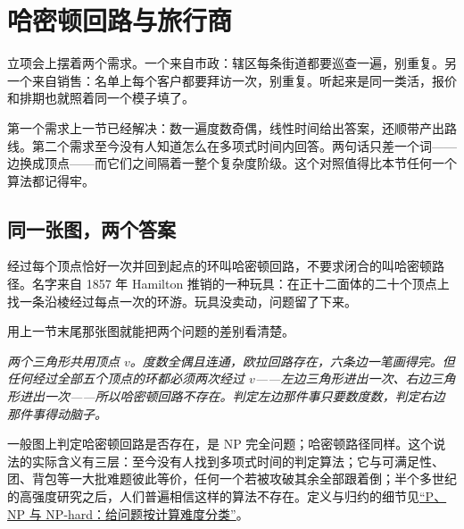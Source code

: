 \section{哈密顿回路与旅行商}
\label{sec:04-Discrete-Mathematics/03-Graph-Theory/08}

立项会上摆着两个需求。一个来自市政：辖区每条街道都要巡查一遍，别重复。另一个来自销售：名单上每个客户都要拜访一次，别重复。听起来是同一类活，报价和排期也就照着同一个模子填了。

第一个需求上一节已经解决：数一遍度数奇偶，线性时间给出答案，还顺带产出路线。第二个需求至今没有人知道怎么在多项式时间内回答。两句话只差一个词——边换成顶点——而它们之间隔着一整个复杂度阶级。这个对照值得比本节任何一个算法都记得牢。

\subsection{同一张图，两个答案}

经过每个顶点恰好一次并回到起点的环叫哈密顿回路，不要求闭合的叫哈密顿路径。名字来自 1857 年 Hamilton 推销的一种玩具：在正十二面体的二十个顶点上找一条沿棱经过每点一次的环游。玩具没卖动，问题留了下来。

用上一节末尾那张图就能把两个问题的差别看清楚。

\begin{center}

\emph{两个三角形共用顶点 \(v\)。度数全偶且连通，欧拉回路存在，六条边一笔画得完。但任何经过全部五个顶点的环都必须两次经过 \(v\)——左边三角形进出一次、右边三角形进出一次——所以哈密顿回路不存在。判定左边那件事只要数度数，判定右边那件事得动脑子。}
\end{center}

一般图上判定哈密顿回路是否存在，是 NP 完全问题；哈密顿路径同样。这个说法的实际含义有三层：至今没有人找到多项式时间的判定算法；它与可满足性、团、背包等一大批难题彼此等价，任何一个若被攻破其余全部跟着倒；半个多世纪的高强度研究之后，人们普遍相信这样的算法不存在。定义与归约的细节见\hyperref[sec:09-Convex-Optimization/09-Complexity-and-Approximation/01]{``P、NP 与 NP-hard：给问题按计算难度分类''}。

